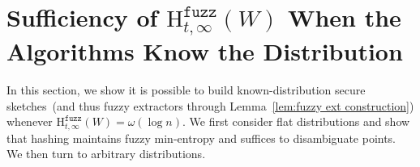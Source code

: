 \documentclass[11pt]{article}
\newcommand{\lemref}[1]{\mbox{Lemma~\ref{#1}}}
\newcommand{\class}[1]{{\ensuremath{\mathsf{#1}}}}
\newcommand{\sketch}{\ensuremath{\class{SS}}\xspace}
\newcommand{\rec}{\ensuremath{\class{Rec}}\xspace}
\newcommand{\dis}{\ensuremath{\mathsf{dis}}}
\newcommand{\Hoo}{\mathrm{H}_\infty}
\newcommand{\Hfuzz}{\mathrm{H}^{\mathtt{fuzz}}_{t,\infty}}
\newtheorem{lemma}[theorem]{Lemma}
\newtheorem{definition}[theorem]{Definition}
\newcommand{\authnote}[2]{{\textcolor{red}{\textsf{#1 notes: }\textcolor{blue}{ #2}}\marginpar{\textcolor{red}{\textbf{!!!!!}}}}}
\newcommand{\authnote}[2]{}
\newcommand{\bnote}[1]{{\authnote{Ben}{#1}}}
\begin{document}
\section{Sufficiency of $\Hfuzz(W)$ When the Algorithms Know the Distribution}
\label{sec:known distributions}
In this section, we show it is possible to build known-distribution secure sketches~(and thus fuzzy extractors through \lemref{lem:fuzzy ext construction}) whenever $\Hfuzz(W)= \omega(\log n)$.
We first consider flat distributions and show that hashing maintains fuzzy min-entropy and suffices to disambiguate points.  We then turn to arbitrary distributions.
%
\end{document}
